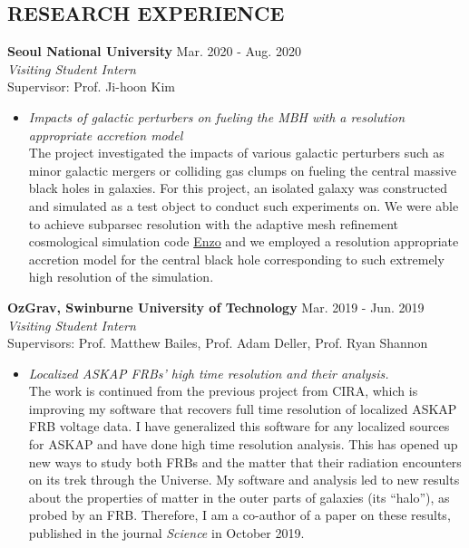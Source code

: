 \documentclass[margin, 10pt]{res} %
\begin{document}
\begin{resume}
 
\section{RESEARCH EXPERIENCE}

{\bf Seoul National University} \hfill Mar. 2020 - Aug. 2020 \\
{\sl Visiting Student Intern} \\
Supervisor: Prof. Ji-hoon Kim
\begin{itemize}
\item[] {\sl Impacts of galactic perturbers on fueling the MBH with a resolution appropriate accretion model}  \\
The project investigated the impacts of various galactic perturbers such as minor galactic mergers or colliding gas clumps on fueling the central massive black holes in galaxies. For this project, an isolated galaxy was constructed and simulated as a test object to conduct such experiments on. We were able to achieve subparsec resolution with the adaptive mesh refinement cosmological simulation code \href{https://enzo-project.org/}{Enzo} and we employed a resolution appropriate accretion model for the central black hole corresponding to such extremely high resolution of the simulation.
\end{itemize} 

{\bf OzGrav, Swinburne University of Technology} \hfill Mar. 2019 - Jun. 2019 \\
{\sl Visiting Student Intern} \\
Supervisors: Prof. Matthew Bailes, Prof. Adam Deller, Prof. Ryan Shannon
\begin{itemize}
\item[] {\sl Localized ASKAP FRBs' high time resolution and their analysis.}\\
The work is continued from the previous project from CIRA, which is improving my software that recovers full time resolution of localized ASKAP FRB voltage data. I have generalized this software for any localized sources for ASKAP and have done high time resolution analysis. This has opened up new ways to study both FRBs and the matter that their radiation encounters on its trek through the Universe. My software and analysis led to new results about the properties of matter in the outer parts of galaxies (its “halo”), as probed by an FRB. Therefore, I am a co-author of a paper on these results, published in the journal \textit{Science} in October 2019.  %
\end{itemize} 


\end{resume}
\end{document}
